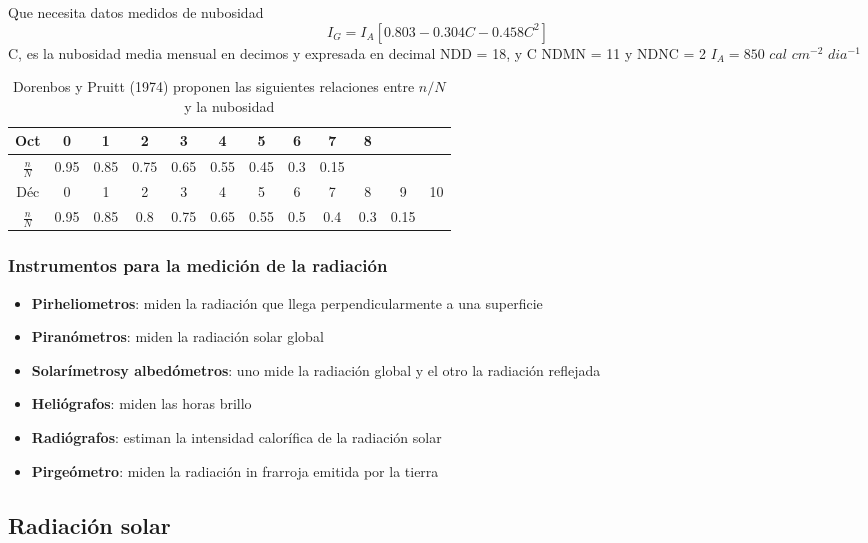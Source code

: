 Que necesita datos medidos de nubosidad
\begin{equation}
    I_G = I_A\left[0.803 - 0.304C - 0.458C^2\right]
\end{equation}
C, es la nubosidad media mensual en decimos y expresada en decimal NDD = 18, y C NDMN = 11 y NDNC = 2
$I_A=850$ $cal$ $cm^{-2}$ $dia^{-1}$
\begin{table}[h!]
    \centering
    \begin{tabular}{@{}cccccccccccc@{}}
    \toprule
    Oct           & 0    & 1    & 2    & 3    & 4    & 5    & 6   & 7    & 8   &      &    \\ \midrule
    $\frac{n}{N}$ & 0.95 & 0.85 & 0.75 & 0.65 & 0.55 & 0.45 & 0.3 & 0.15 &     &      &    \\
    Déc           & 0    & 1    & 2    & 3    & 4    & 5    & 6   & 7    & 8   & 9    & 10 \\
    $\frac{n}{N}$ & 0.95 & 0.85 & 0.8  & 0.75 & 0.65 & 0.55 & 0.5 & 0.4  & 0.3 & 0.15 &    \\ \bottomrule
    \end{tabular}
    \caption{Dorenbos y Pruitt (1974) proponen las siguientes relaciones entre $n/N$ y la nubosidad}
    \label{tabma14}
\end{table}

\subsubsection{Instrumentos para la medición de la radiación}

\begin{itemize}
    \item \textbf{Pirheliometros}: miden la radiación que llega perpendicularmente a una superficie
    \item \textbf{Piranómetros}: miden la radiación solar global
    \item \textbf{Solarímetrosy albedómetros}: uno mide la radiación global y el otro la radiación reflejada
    \item \textbf{Heliógrafos}: miden las horas brillo
    \item \textbf{Radiógrafos}: estiman la intensidad calorífica de la radiación solar
    \item \textbf{Pirgeómetro}: miden la radiación in frarroja emitida por la tierra
\end{itemize}

\subsection{Radiación solar}

